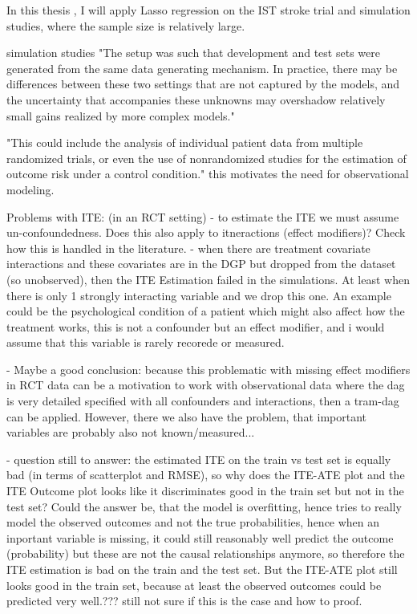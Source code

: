 In this thesis , I will apply Lasso regression on the IST stroke trial and simulation studies, where the sample size is relatively large.


simulation studies
 "The setup was such that development and test sets were generated from the same data generating mechanism. In practice, there may be differences between these two settings that are not captured by the models, and the uncertainty that accompanies these unknowns may overshadow relatively small gains realized by more complex models."
 
 "This could include the analysis of individual patient data from multiple randomized trials, or even the use of nonrandomized studies for the estimation of outcome risk under a control condition." this motivates the need for observational modeling.


Problems with ITE: (in an RCT setting)
- to estimate the ITE we must assume un-confoundedness. Does this also apply to itneractions (effect modifiers)? Check how this is handled in the literature.
- when there are treatment covariate interactions and these covariates are in the DGP but dropped from the dataset (so unobserved), then the ITE Estimation failed in the simulations. At least when there is only 1 strongly interacting variable and we drop this one. An example could be the psychological condition of a patient which might also affect how the treatment works, this is not a confounder but an effect modifier, and i would assume that this variable is rarely recorede or measured.

- Maybe a good conclusion: because this problematic with missing effect modifiers in RCT data can be a motivation to work with observational data where the dag is very detailed specified with all confounders and interactions, then a tram-dag can be applied. However, there we also have the problem, that important variables are probably also not known/measured...

- question still to answer: the estimated ITE on the train vs test set is equally bad (in terms of scatterplot and RMSE), so why does the ITE-ATE plot and the ITE Outcome plot looks like it discriminates good in the train set but not in the test set? Could the answer be, that the model is overfitting, hence tries to really model the observed outcomes and not the true probabilities, hence when an inportant variable is missing, it could still reasonably well predict the outcome (probability) but these are not the causal relationships anymore, so therefore the ITE estimation is bad on the train and the test set. But the ITE-ATE plot still looks good in the train set, because at least the observed outcomes could be predicted very well.??? still not sure if this is the case and how to proof.

